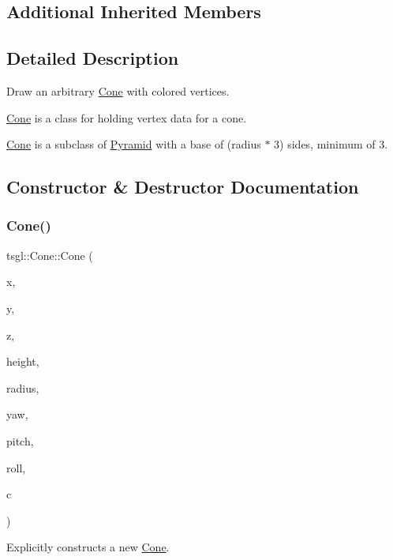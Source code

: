 \subsection*{Additional Inherited Members}


\subsection{Detailed Description}
Draw an arbitrary \hyperlink{classtsgl_1_1_cone}{Cone} with colored vertices. 

\hyperlink{classtsgl_1_1_cone}{Cone} is a class for holding vertex data for a cone.

\hyperlink{classtsgl_1_1_cone}{Cone} is a subclass of \hyperlink{classtsgl_1_1_pyramid}{Pyramid} with a base of (radius $\ast$ 3) sides, minimum of 3. 

\subsection{Constructor \& Destructor Documentation}
\mbox{\label{classtsgl_1_1_cone_a1bbc50a0f701f7124426d62ef3cfc6d7}} 
\subsubsection{\texorpdfstring{Cone()}{Cone()}\hspace{0.1cm}{\footnotesize\ttfamily [1/2]}}
{\footnotesize\ttfamily tsgl\+::\+Cone\+::\+Cone (\begin{DoxyParamCaption}\item[{float}]{x,  }\item[{float}]{y,  }\item[{float}]{z,  }\item[{float}]{height,  }\item[{float}]{radius,  }\item[{float}]{yaw,  }\item[{float}]{pitch,  }\item[{float}]{roll,  }\item[{\hyperlink{structtsgl_1_1_color_float}{Color\+Float}}]{c }\end{DoxyParamCaption})}



Explicitly constructs a new \hyperlink{classtsgl_1_1_cone}{Cone}. 

